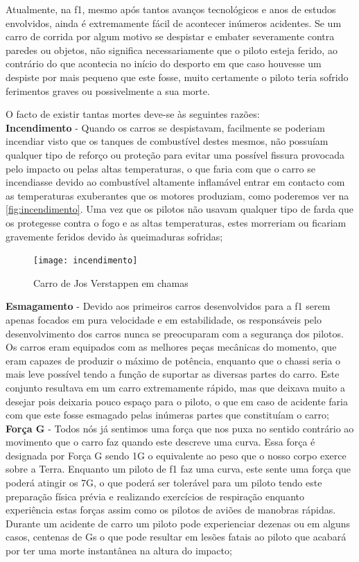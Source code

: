 \documentclass{report}
\begin{document}
Atualmente, na \ac{f1}, mesmo após tantos avanços tecnológicos e anos de estudos envolvidos, ainda é extremamente fácil de acontecer inúmeros acidentes. Se um carro de corrida por algum motivo se despistar e embater severamente contra paredes ou objetos, não significa necessariamente que o piloto esteja ferido, ao contrário do que acontecia no início do desporto em que caso houvesse um despiste por mais pequeno que este fosse, muito certamente o piloto teria sofrido ferimentos graves ou possivelmente a sua morte. 


O facto de existir tantas mortes deve-se às seguintes razões:\\[0.5cm]
\textbf{Incendimento} - Quando os carros se despistavam, facilmente se poderiam incendiar visto que os tanques de combustível destes mesmos, não possuíam qualquer tipo de reforço ou proteção para evitar uma possível fissura provocada pelo impacto ou pelas altas temperaturas, o que faria com que o carro se incendiasse devido ao combustível altamente inflamável entrar em contacto com as temperaturas exuberantes que os motores produziam, como poderemos ver na \autoref{fig:incendimento}. Uma vez que os pilotos não usavam qualquer tipo de farda que os protegesse contra o fogo e as altas temperaturas, estes morreriam ou ficariam gravemente feridos devido às queimaduras sofridas;\\[1.1cm]
\begin{figure}[h]
\center %
\texttt{[image: incendimento]}
\caption{Carro de Jos Verstappen em chamas}
\label{fig:incendimento}
\end{figure}


\textbf{Esmagamento} -  Devido aos primeiros carros desenvolvidos para a \ac{f1} serem apenas focados em pura velocidade e em estabilidade, os responsáveis pelo desenvolvimento dos carros nunca se preocuparam com a segurança dos pilotos. Os carros eram equipados com as melhores peças mecânicas do momento, que eram capazes de produzir o máximo de potência, enquanto que o chassi seria o mais leve possível tendo a função de suportar as diversas partes do carro. Este conjunto resultava em um carro extremamente rápido, mas que deixava muito a desejar pois deixaria pouco espaço para o piloto, o que em caso de acidente faria com que este fosse esmagado pelas inúmeras partes que constituíam o carro;\\[0.5cm]

\textbf{Força G} - Todos nós já sentimos uma força que nos puxa no sentido contrário ao movimento que o carro faz quando este descreve uma curva. Essa força é designada por Força G \cite{forcag} sendo 1G \cite{gravidade} o equivalente ao peso que o nosso corpo exerce sobre a Terra. Enquanto um piloto de \ac{f1} faz uma curva, este sente uma força que poderá atingir os 7G, o que poderá ser tolerável para um piloto tendo este preparação física prévia e realizando exercícios de respiração enquanto experiência estas forças assim como os pilotos de aviões de manobras rápidas.
Durante um acidente de carro um piloto pode experienciar dezenas ou em alguns casos, centenas de Gs o que pode resultar em lesões fatais ao piloto que acabará por ter uma morte instantânea na altura do impacto;\\[2.5cm]
\end{document}
